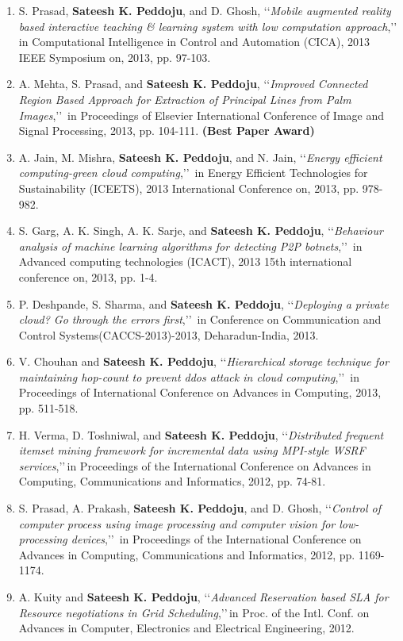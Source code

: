 \begin{enumerate}[label=(C\arabic*).]
	\item
	S. Prasad, \textbf{Sateesh K. Peddoju}, and D. Ghosh, \lq\lq \textit{Mobile augmented reality based interactive teaching \& learning system with low computation approach},\rq\rq\, in Computational Intelligence in Control and Automation (CICA), 2013 IEEE Symposium on, 2013, pp. 97-103.
	
	\item
	A. Mehta, S. Prasad, and  \textbf{Sateesh K. Peddoju}, \lq\lq \textit{Improved Connected Region Based Approach for Extraction of Principal Lines from Palm Images},\rq\rq\, in Proceedings of Elsevier International Conference of Image and Signal Processing, 2013, pp. 104-111. \textbf{(Best Paper Award)}
	
	\item
	A. Jain, M. Mishra, \textbf{Sateesh K. Peddoju}, and N. Jain, \lq\lq \textit{Energy efficient computing-green cloud computing},\rq\rq\, in Energy Efficient Technologies for Sustainability (ICEETS), 2013 International Conference on, 2013, pp. 978-982.
	
	\item
	S. Garg, A. K. Singh, A. K. Sarje, and \textbf{Sateesh K. Peddoju}, \lq\lq \textit{Behaviour analysis of machine learning algorithms for detecting P2P botnets},\rq\rq\, in Advanced computing technologies (ICACT), 2013 15th international conference on, 2013, pp. 1-4.
	
	\item
	P. Deshpande, S. Sharma, and \textbf{Sateesh K. Peddoju}, \lq\lq \textit{Deploying a private cloud? Go through the errors first},\rq\rq\, in Conference on Communication and Control Systems(CACCS-2013)-2013, Deharadun-India, 2013.
	
	
	\item
	V. Chouhan and \textbf{Sateesh K. Peddoju}, \lq\lq \textit{Hierarchical storage technique for maintaining hop-count to prevent ddos attack in cloud computing},\rq\rq\, in Proceedings of International Conference on Advances in Computing, 2013, pp. 511-518.
	
	\item
	H. Verma, D. Toshniwal, and  \textbf{Sateesh K. Peddoju}, \lq\lq \textit{Distributed frequent itemset mining framework for incremental data using MPI-style WSRF services},\rq\rq\,in Proceedings of the International Conference on Advances in Computing, Communications and Informatics, 2012, pp. 74-81.
	
	\item
	S. Prasad, A. Prakash, \textbf{Sateesh K. Peddoju}, and D. Ghosh, \lq\lq \textit{Control of computer process using image processing and computer vision for low-processing devices},\rq\rq\, in Proceedings of the International Conference on Advances in Computing, Communications and Informatics, 2012, pp. 1169-1174.
	
	\item
	A. Kuity and \textbf{Sateesh K. Peddoju}, \lq\lq \textit{Advanced Reservation based SLA for Resource negotiations in Grid Scheduling},\rq\rq\,in Proc. of the Intl. Conf. on Advances in Computer, Electronics and Electrical Engineering, 2012.
	
	\end{enumerate}